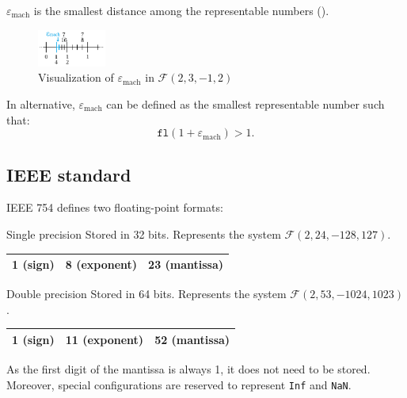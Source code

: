 $\varepsilon_{\text{mach}}$ is the smallest distance among the representable numbers ().
\begin{figure}[H]
    \centering
    \includegraphics[width=0.2\textwidth]{img/machine_eps.png}
    \caption{Visualization of $\varepsilon_{\text{mach}}$ in $\mathcal{F}(2, 3, -1, 2)$}
    \label{fig:finnum_eps}
\end{figure}

In alternative, $\varepsilon_{\text{mach}}$ can be defined as the smallest representable number such that:
\begin{equation*}
    \texttt{fl}(1 + \varepsilon_{\text{mach}}) > 1.
\end{equation*}


\subsection{IEEE standard}
IEEE 754 defines two floating-point formats:
\begin{descriptionlist}
    \item[Single precision] Stored in 32 bits. Represents the system $\mathcal{F}(2, 24, -128, 127)$. 
        \begin{center}
            \small
            \begin{tabular}{|c|c|c|}
                \hline
                1 (sign) & 8 (exponent) & 23 (mantissa) \\
                \hline
            \end{tabular}
        \end{center}

    \item[Double precision] Stored in 64 bits. Represents the system $\mathcal{F}(2, 53, -1024, 1023)$. 
        \begin{center}
            \small
            \begin{tabular}{|c|c|c|}
                \hline
                1 (sign) & 11 (exponent) & 52 (mantissa) \\
                \hline
            \end{tabular}
        \end{center}
\end{descriptionlist}
As the first digit of the mantissa is always 1, it does not need to be stored.
Moreover, special configurations are reserved to represent \texttt{Inf} and \texttt{NaN}.


